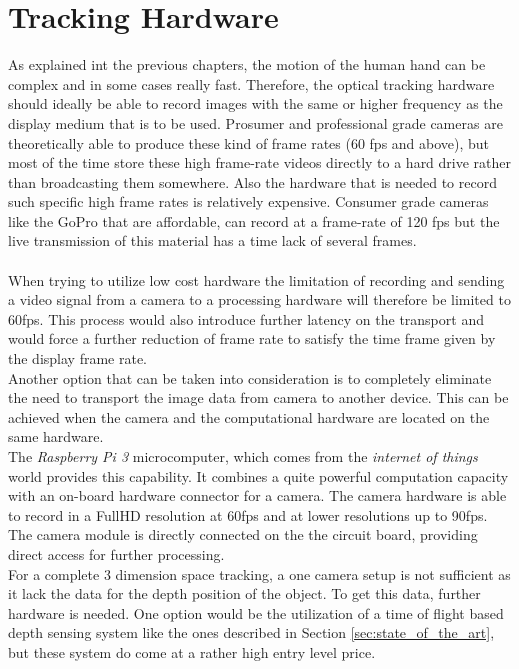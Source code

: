 \section{Tracking Hardware}
 As explained int the previous chapters, the motion of the human hand can be complex and in some cases really fast. Therefore, the optical tracking hardware should ideally be able to record images with the same or higher frequency as the display medium that is to be used. Prosumer and professional grade cameras are theoretically able to produce these kind of frame rates (60 fps and above), but most of the time store these high frame-rate videos directly to a hard drive rather than broadcasting them somewhere. Also the hardware that is needed to record such specific high frame rates is relatively expensive. Consumer grade cameras like the GoPro that are affordable, can record at a frame-rate of 120 fps but the live transmission of this material has a time lack of several frames.\\
\\When trying to utilize low cost hardware the limitation of recording and sending a video signal from a camera to a processing hardware will therefore be limited to 60fps. This process would also introduce further latency on the transport and would force a further reduction of frame rate to satisfy the time frame given by the display frame rate.
\\Another option that can be taken into consideration is to completely eliminate the need to transport the image data from camera to another device. This can be achieved when the camera and the computational hardware are located on the same hardware.\\The \textit{Raspberry Pi 3} microcomputer, which comes from the \textit{internet of things} world provides this capability. It combines a quite powerful computation capacity with an on-board hardware connector for a camera. The camera hardware is able to record in a FullHD resolution at 60fps and at lower resolutions up to 90fps. The camera module is directly connected on the the circuit board, providing direct access for further processing.\\
For a complete 3 dimension space tracking, a one camera setup is not sufficient as it lack the data for the depth position of the object. To get this data, further hardware is needed. One option would be the utilization of a time of flight based depth sensing system like the ones described in Section \ref{sec:state_of_the_art}, but these system do come at a rather high entry level price.
